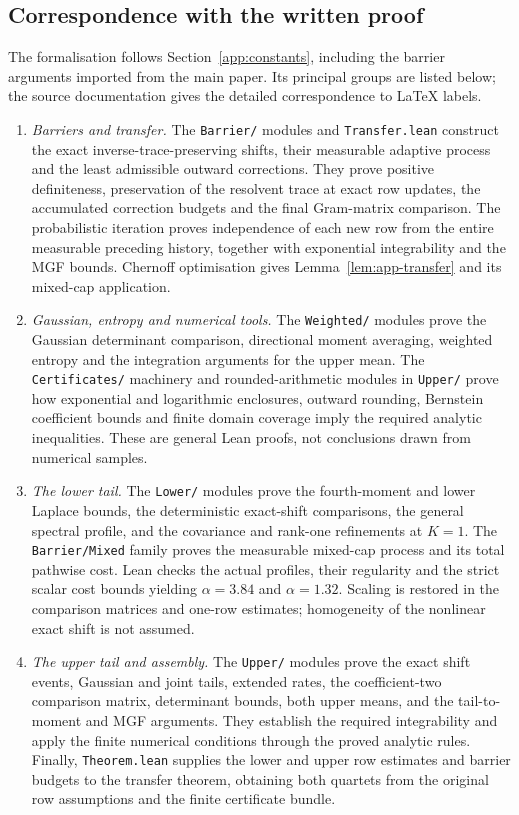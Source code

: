 \documentclass[11pt,a4paper]{article}
\numberwithin{equation}{section}
\begin{document}
\subsection{Correspondence with the written proof}
\label{app:lean-structure}

The formalisation follows Section~\ref{app:constants}, including the barrier
arguments imported from the main paper. Its principal groups are listed below;
the source documentation gives the detailed correspondence to LaTeX labels.

\begin{enumerate}
\item \emph{Barriers and transfer.}
The \texttt{Barrier/} modules and \texttt{Transfer.lean} construct the exact
inverse-trace-preserving shifts, their measurable adaptive process and the
least admissible outward corrections. They prove positive definiteness,
preservation of the resolvent trace at exact row updates, the accumulated
correction budgets and the final Gram-matrix comparison. The probabilistic
iteration proves independence of each new row from the entire measurable
preceding history, together with exponential integrability and the MGF bounds.
Chernoff optimisation gives Lemma~\ref{lem:app-transfer} and its mixed-cap
application.

\item \emph{Gaussian, entropy and numerical tools.}
The \texttt{Weighted/} modules prove the Gaussian determinant comparison,
directional moment averaging, weighted entropy and the integration arguments
for the upper mean. The \texttt{Certificates/} machinery and rounded-arithmetic
modules in \texttt{Upper/} prove how exponential and logarithmic enclosures,
outward rounding, Bernstein coefficient bounds and finite domain coverage
imply the required analytic inequalities. These are general Lean proofs,
not conclusions drawn from numerical samples.

\item \emph{The lower tail.}
The \texttt{Lower/} modules prove the fourth-moment and lower Laplace bounds,
the deterministic exact-shift comparisons, the general spectral profile,
and the covariance and rank-one refinements at $K=1$. The
\texttt{Barrier/Mixed} family proves the measurable mixed-cap process and its
total pathwise cost. Lean checks the actual profiles, their regularity and
the strict scalar cost bounds yielding $\alpha=3.84$ and $\alpha=1.32$.
Scaling is restored in the comparison matrices and one-row estimates;
homogeneity of the nonlinear exact shift is not assumed.

\item \emph{The upper tail and assembly.}
The \texttt{Upper/} modules prove the exact shift events, Gaussian and joint
tails, extended rates, the coefficient-two comparison matrix, determinant
bounds, both upper means, and the tail-to-moment and MGF arguments. They
establish the required integrability and apply the finite numerical
conditions through the proved analytic rules. Finally,
\texttt{Theorem.lean} supplies the lower and upper row estimates and barrier
budgets to the transfer theorem, obtaining both quartets from the original
row assumptions and the finite certificate bundle.
\end{enumerate}
\end{document}
